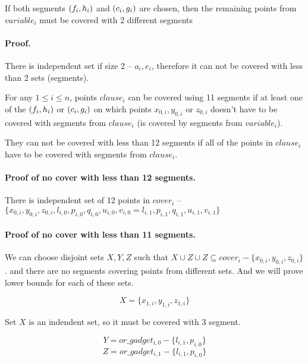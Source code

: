 \begin{lemma}
\label{choose_variables_both}
If both segments $(f_i, h_i)$ and $(c_i, g_i)$ are chosen, then
the remaining points from $variable_i$ must be covered with 2 different
segments
\end{lemma}
\paragraph{Proof.}
There is independent set if size 2 -- $a_i, e_i$, therefore it can
not be covered with less than 2 sets (segments).


\begin{lemma}
\label{cover_clauses_segments_no_less}
For any $1 \le i \le n$, points $clause_i$
can be covered using 11 segments if at least one of the $(f_i, h_i)$
or $(c_i, g_i)$ on which points $x_{0, i}, y_{0, i}$ or $z_{0, i}$
doesn't have to be covered with segments from $clause_i$ (is covered by
segments from $variable_i$).

They can not be covered with less than 12 segments if all of the points
in $clause_i$ have to be covered with segments from $clause_i$.
\end{lemma}


\paragraph{Proof of no cover with less than 12 segments.}
There is independent set of 12 points in $cover_i$ -- 
$\{ x_{0, i}, y_{0, i}, z_{0, i}, l_{i, 0}, p_{i, 0}, q_{i, 0}, u_{i, 0}, v_{i, 0} = l_{i, 1},
 p_{i, 1}, q_{i, 1}, u_{i, 1}, v_{i, 1} \}$

\paragraph{Proof of no cover with less than 11 segments.}

We can choose disjoint sets $X, Y, Z$ such that
$X \cup Z \cup Z \subseteq cover_i - \{x_{0, i}, y_{0, i}, z_{0, i}\}$.
and there are no segments covering points from different sets.
And we will prove lower bounds for each of these sets.

$$X = \{x_{1, i}, y_{1, i}, z_{1, i}\}$$

Set $X$ is an indendent set, so it must be covered with 3 segment.

$$Y = or\_gadget_{i, 0} - \{l_{i, 1}, p_{i, 0}\}$$
$$Z = or\_gadget_{i, 1} - \{l_{i, 1}, p_{i, 0}\}$$


